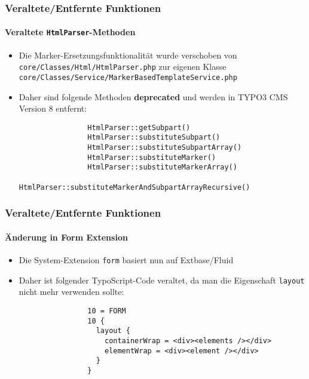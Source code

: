\begin{frame}[fragile]
	\frametitle{Veraltete/Entfernte Funktionen}
	\framesubtitle{Veraltete \texttt{HtmlParser}-Methoden}


	\begin{itemize}

		\item Die Marker-Ersetzungsfunktionalität wurde verschoben von\newline
			\texttt{core/Classes/Html/HtmlParser.php}\newline
			zur eigenen Klasse\newline
			\texttt{core/Classes/Service/MarkerBasedTemplateService.php}

		\item Daher sind folgende Methoden \textbf{deprecated} und werden in TYPO3 CMS Version 8 entfernt:

			\begin{lstlisting}
				HtmlParser::getSubpart()
				HtmlParser::substituteSubpart()
				HtmlParser::substituteSubpartArray()
				HtmlParser::substituteMarker()
				HtmlParser::substituteMarkerArray()
				HtmlParser::substituteMarkerAndSubpartArrayRecursive()
			\end{lstlisting}

	\end{itemize}

\end{frame}


\begin{frame}[fragile]
	\frametitle{Veraltete/Entfernte Funktionen}
	\framesubtitle{Änderung in Form Extension}

	\begin{itemize}

		\item Die System-Extension \texttt{form} basiert nun auf Extbase/Fluid

		\item Daher ist folgender TypoScript-Code veraltet, da man die Eigenschaft \texttt{layout}
			nicht mehr verwenden sollte:

			\begin{lstlisting}
				10 = FORM
				10 {
				  layout {
				    containerWrap = <div><elements /></div>
				    elementWrap = <div><element /></div>
				  }
				}
			\end{lstlisting}

	\end{itemize}

\end{frame}

